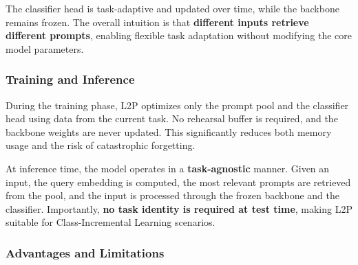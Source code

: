 The classifier head is task-adaptive and updated over time, while the backbone remains
frozen. The overall intuition is that \textbf{different inputs retrieve different prompts},
enabling flexible task adaptation without modifying the core model parameters.

\subsubsection{Training and Inference}

During the training phase, L2P optimizes only the prompt pool and the classifier head using
data from the current task. No rehearsal buffer is required, and the backbone weights are
never updated. This significantly reduces both memory usage and the risk of catastrophic
forgetting.

At inference time, the model operates in a \textbf{task-agnostic} manner. Given an input,
the query embedding is computed, the most relevant prompts are retrieved from the pool, and
the input is processed through the frozen backbone and the classifier. Importantly, \textbf{no
task identity is required at test time}, making L2P suitable for Class-Incremental Learning
scenarios.

\subsubsection{Advantages and Limitations}

\vspace{0.3cm}


